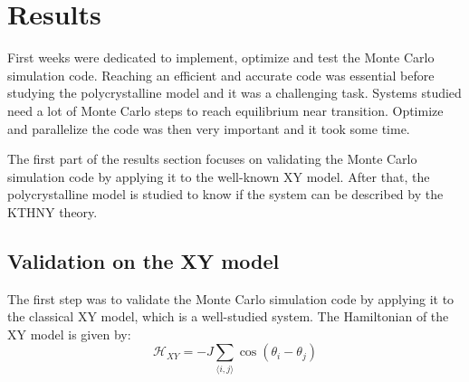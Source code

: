 \section{Results}

First weeks were dedicated to implement, optimize and test the Monte Carlo simulation code. Reaching an efficient and accurate code was essential before studying the polycrystalline model and it was a challenging task. Systems studied need a lot of Monte Carlo steps to reach equilibrium near transition. Optimize and parallelize the code was then very important and it took some time.

The first part of the results section focuses on validating the Monte Carlo simulation code by applying it to the well-known XY model. After that, the polycrystalline model is studied to know if the system can be described by the KTHNY theory.

\subsection{Validation on the XY model}

The first step was to validate the Monte Carlo simulation code by applying it to the classical XY model, which is a well-studied system. The Hamiltonian of the XY model is given by:
\begin{equation}
    \mathcal{H}_{XY} = -J \sum_{\langle i,j \rangle} \cos(\theta_i - \theta_j)
\end{equation}

